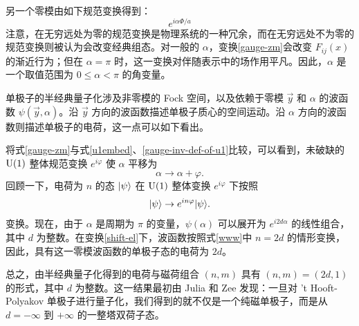 另一个零模由如下规范变换得到：
\begin{equation}
e^{ i \alpha \Phi/a }\label{gauge-zm}
\end{equation}
注意，在无穷远处为零的规范变换是物理系统的一种冗余，而在无穷远处不为零的规范变换则被认为会改变经典组态。对一般的 $\alpha$，变换\eqref{gauge-zm}会改变 $F_{ij}(x)$ 的渐近行为；但在 $\alpha=\pi$ 时，这一变换对伴随表示中的场作用平凡。因此，$\alpha$ 是一个取值范围为 $0\le\alpha<\pi$ 的角变量。

单极子的半经典量子化涉及非零模的 Fock 空间，以及依赖于零模 $\vec y$ 和 $\alpha$ 的波函数 $\psi(\vec y,\alpha)$。沿 $\vec y$ 方向的波函数描述单极子质心的空间运动。沿 $\alpha$ 方向的波函数则描述单极子的电荷，这一点可以如下看出。

将式\eqref{gauge-zm}与式\eqref{u1embed}、\eqref{gauge-inv-def-of-u1}比较，可以看到，未破缺的 ${\mathrm{U}}(1)$ 整体规范变换 $e^{i\varphi}$ 使 $\alpha$ 平移为
\begin{equation}
\alpha\to \alpha+\varphi.\label{shift-el}
\end{equation}
回顾一下，电荷为 $n$ 的态 $|\psi\rangle$ 在 ${\mathrm{U}}(1)$ 整体变换 $e^{i\varphi}$ 下按照
\begin{equation}
|\psi\rangle \to e^{in\varphi} |\psi\rangle.\label{www}
\end{equation}
变换。现在，由于 $\alpha$ 是周期为 $\pi$ 的变量，$\psi(\alpha)$ 可以展开为 $e^{i2d\alpha}$ 的线性组合，其中 $d$ 为整数。在变换\eqref{shift-el}下，波函数按照式\eqref{www}中 $n=2d$ 的情形变换，因此，具有这一零模波函数的单极子态的电荷为 $2d$。

总之，由半经典量子化得到的电荷与磁荷组合 $(n,m)$ 具有 $(n,m)=(2d,1)$ 的形式，其中 $d$ 为整数。这一结果最初由 Julia 和 Zee 发现：一旦对 't Hooft-Polyakov 单极子进行量子化，我们得到的就不仅是一个纯磁单极子，而是从 $d=-\infty$ 到 $+\infty$ 的一整塔双荷子态。


